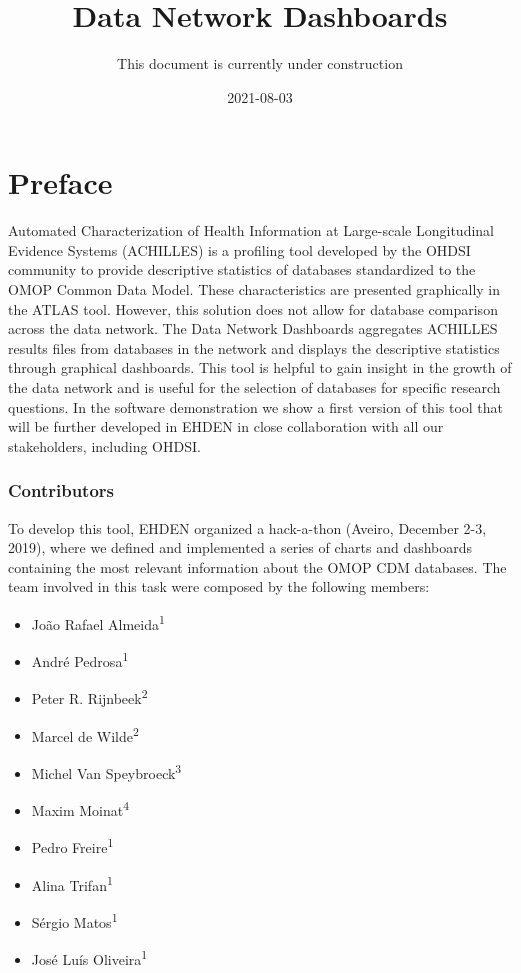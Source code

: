 \documentclass[
]{book}
\title{Data Network Dashboards}
\author{This document is currently under construction}
\date{2021-08-03}
\providecommand{\tightlist}{%
  \setlength{\itemsep}{0pt}\setlength{\parskip}{0pt}}
\begin{document}
\maketitle

{
\setcounter{tocdepth}{1}
\tableofcontents
}
\hypertarget{preface}{%
\chapter{Preface}\label{preface}}

Automated Characterization of Health Information at Large-scale Longitudinal Evidence Systems (ACHILLES) is a profiling tool developed by the OHDSI community to provide descriptive statistics of databases standardized to the OMOP Common Data Model. These characteristics are presented graphically in the ATLAS tool. However, this solution does not allow for database comparison across the data network. The Data Network Dashboards aggregates ACHILLES results files from databases in the network and displays the descriptive statistics through graphical dashboards. This tool is helpful to gain insight in the growth of the data network and is useful for the selection of databases for specific research questions. In the software demonstration we show a first version of this tool that will be further developed in EHDEN in close collaboration with all our stakeholders, including OHDSI.

\hypertarget{contributors}{%
\subsection*{Contributors}\label{contributors}}

To develop this tool, EHDEN organized a hack-a-thon (Aveiro, December 2-3, 2019), where we defined and implemented a series of charts and dashboards containing the most relevant information about the OMOP CDM databases. The team involved in this task were composed by the following members:

\begin{itemize}
\tightlist
\item
  João Rafael Almeida\textsuperscript{1}
\item
  André Pedrosa\textsuperscript{1}
\item
  Peter R. Rijnbeek\textsuperscript{2}
\item
  Marcel de Wilde\textsuperscript{2}
\item
  Michel Van Speybroeck\textsuperscript{3}
\item
  Maxim Moinat\textsuperscript{4}
\item
  Pedro Freire\textsuperscript{1}
\item
  Alina Trifan\textsuperscript{1}
\item
  Sérgio Matos\textsuperscript{1}
\item
  José Luís Oliveira\textsuperscript{1}
\end{itemize}
\end{document}
